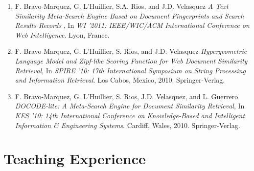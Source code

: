 \documentclass[letterpaper]{article}
\begin{document}
\begin{enumerate}
\item F. Bravo-Marquez, G. L'Huillier, S.A. Rios, and J.D. Velasquez \textit{A Text Similarity Meta-Search Engine Based on Document Fingerprints and Search Results Records} , In \textit{WI '2011: IEEE/WIC/ACM International Conference on Web Intelligence}. Lyon, France. 

\item F. Bravo-Marquez, G. L'Huillier, S. Rios, and J.D. Velasquez  \textit{Hypergeometric Language Model and Zipf-like Scoring Function for Web Document Similarity Retrieval}, In \textit{SPIRE '10: 17th International Symposium on String Processing and Information Retrieval}. Los Cabos, Mexico, 2010. Springer-Verlag.

\item F. Bravo-Marquez, G. L'Huillier, S. Rios, J.D. Velasquez, and L. Guerrero  \textit{DOCODE-lite: A Meta-Search Engine for Document Similarity Retrieval}, In \textit{KES '10: 14th International Conference on Knowledge-Based and Intelligent Information \& Engineering Systems}. Cardiff, Wales, 2010. Springer-Verlag.

\end{enumerate}



\section{Teaching Experience}
\end{document}
